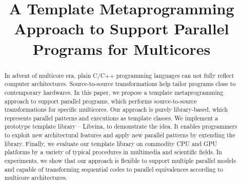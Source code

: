 \documentclass[10pt, conference, paperletter]{IEEEtran}
\begin{document}
\title{A Template Metaprogramming Approach to Support Parallel
  Programs for Multicores}


\author{
}
\maketitle


\begin{abstract}
In advent of multicore era, plain C/C++ programming languages can not
fully reflect computer architectures. Source-to-source
transformations help tailor programs close to contemporary
hardwares. In this paper, we propose a template metaprogramming
approach to support parallel programs, which performs
source-to-source transformations for specific
multicores. Our approach is purely library-based, which represents
parallel patterns and executions as template classes. We implement a prototype
template library -- Libvina, to demonstrate the idea. It enables
programmers to exploit new architectural
features and apply new parallel patterns by extending the library. 
Finally, we evaluate our template library on
commodity CPU and GPU platforms by a variety of typical procedures
in multimedia and scientific fields. In experiments, we show that our
approach is flexible to support multiple parallel models and capable
of transforming sequential codes to parallel equivalences according to
multicore architectures. 
\end{abstract}

\IEEEpeerreviewmaketitle



%






%


\end{document}
